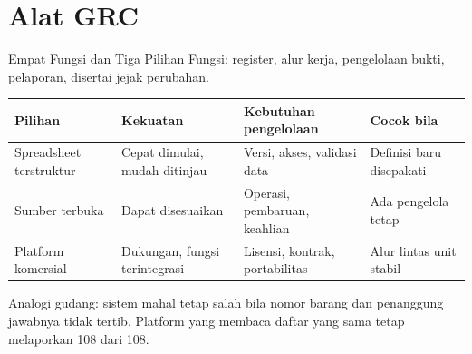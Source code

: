\documentclass[aspectratio=169, table, 12pt]{beamer}
\begin{document}
\section{Alat GRC}

\begin{frame}{{\Large Empat Fungsi dan Tiga Pilihan}}
  \vspace{2pt}
  \footnotesize
  Fungsi: register, alur kerja, pengelolaan bukti, pelaporan, disertai jejak perubahan.

  \vspace{6pt}
  \scriptsize
  \begin{tabularx}{\textwidth}{|>{\raggedright\arraybackslash}p{}|>{\raggedright\arraybackslash}X|>{\raggedright\arraybackslash}X|>{\raggedright\arraybackslash}X|}
    \hline
    \textbf{Pilihan} & \textbf{Kekuatan} & \textbf{Kebutuhan pengelolaan} & \textbf{Cocok bila} \\
    \hline
    Spreadsheet terstruktur & Cepat dimulai, mudah ditinjau & Versi, akses, validasi data & Definisi
    baru disepakati \\ \hline
    Sumber terbuka & Dapat disesuaikan & Operasi, pembaruan, keahlian & Ada pengelola tetap \\ \hline
    Platform komersial & Dukungan, fungsi terintegrasi & Lisensi, kontrak, portabilitas & Alur lintas
    unit stabil \\ \hline
  \end{tabularx}

  \vspace{6pt}
  \footnotesize Analogi gudang: sistem mahal tetap salah bila nomor barang dan penanggung jawabnya
  tidak tertib. Platform yang membaca daftar yang sama tetap melaporkan 108 dari 108.
\end{frame}
\end{document}
